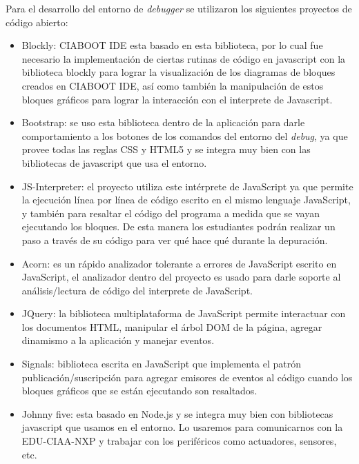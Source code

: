 Para el desarrollo del entorno de \emph{debugger} se utilizaron los siguientes proyectos de código abierto:

\begin{itemize}
	\item Blockly\citep{blockly}: CIABOOT IDE esta basado en esta biblioteca, por lo cual fue necesario la implementación de ciertas rutinas de código en javascript con la biblioteca blockly para lograr la visualización de los diagramas de bloques creados en CIABOOT IDE, así como también la manipulación de estos bloques gráficos para lograr la interacción con el interprete de Javascript. 
	
	\item Bootstrap\citep{bootstrap}: se uso esta biblioteca dentro de la aplicación para darle comportamiento a los botones de los comandos del entorno del \emph{debug}, ya que provee todas las reglas CSS y HTML5 y se integra muy bien con las bibliotecas de javascript que usa el entorno.
	
	\item JS-Interpreter\citep{js-Interpreter}: el proyecto utiliza este intérprete de JavaScript ya que permite la ejecución línea por línea de código escrito en el mismo lenguaje JavaScript, y también para resaltar el código del programa a medida que se vayan ejecutando los bloques. De esta manera los estudiantes podrán realizar un paso a través de su código para ver qué hace qué durante la depuración. 

	\item Acorn\citep{acorn}: es un rápido analizador tolerante a errores de JavaScript escrito en JavaScript, el analizador dentro del proyecto es usado para darle soporte al análisis/lectura de código del interprete de JavaScript.
	
	\item JQuery\citep{jQuery}: la biblioteca multiplataforma de JavaScript permite interactuar con los documentos HTML, manipular el árbol DOM de la página, agregar dinamismo a la aplicación y manejar eventos.
	
	\item Signals\citep{signals}: biblioteca escrita en JavaScript que implementa el patrón publicación/suscripción para agregar emisores de eventos al código cuando los bloques gráficos que se están ejecutando son resaltados.
	
	\item Johnny five\citep{johnny}: esta basado en Node.js y se integra muy bien con bibliotecas javascript que usamos en el entorno. Lo usaremos para comunicarnos con la EDU-CIAA-NXP y trabajar con los periféricos como actuadores, sensores, etc.
	

\end{itemize}
